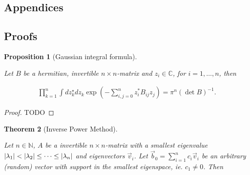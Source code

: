 \documentclass{article}
\theoremstyle{plain} %
\newtheorem{theorem}{Theorem}[section]
\newtheorem{prop}[theorem]{Proposition}
\theoremstyle{convention} %
\theoremstyle{remark} %
\numberwithin{equation}{section}
\begin{document}
\begin{appendix}

\section*{Appendices} %
\renewcommand{\thesubsection}{\Alph{subsection}} %

\renewcommand{\thetheorem}{\Alph{subsection}.\arabic{theorem}}
\renewcommand{\thedefinition}{\Alph{subsection}.\arabic{definition}}
\renewcommand{\thecorollary}{\Alph{subsection}.\arabic{corollary}}
\renewcommand{\theexample}{\Alph{subsection}.\arabic{example}}
\renewcommand{\theprop}{\Alph{subsection}.\arabic{prop}}
\renewcommand{\thelemma}{\Alph{subsection}.\arabic{lemma}}

\subsection{Proofs}
\label{sec:proofs}

\begin{prop}[Gaussian integral formula]

\label{prop:gauss_integral}

Let $B$ be a hermitian, invertible $n \times n$-matrix and $z_i \in \mathbb{C}$, for $i = 1, \dots, n$, then

\begin{align*}
  \prod_{k=1}^n \int d z_k^{\star} d z_k \exp( - \sum_{i,j=0}^n z_i^{*} B_{ij} z_j ) = \pi^n (\det B)^{-1}.
\end{align*}

\end{prop}

\begin{proof}

TODO

\end{proof}

\begin{theorem}[Inverse Power Method]

\label{thm:inverse_power_method}

Let $n \in \mathbb{N}$, $A$ be a invertible $n \times n$-matrix with a smallest eigenvalue $\abs{\lambda_1} < \abs{\lambda_2} \leq \dots \leq \abs{\lambda_n}$ and eigenvectors $\vec{v}_i$. Let $\vec{b}_0 = \sum_{i=1}^n c_i \vec{v}_i$ be an arbitrary (random) vector with support in the smallest eigenspace, ie. $c_1 \neq 0$. Then


\end{theorem}
\end{appendix}
\end{document}

